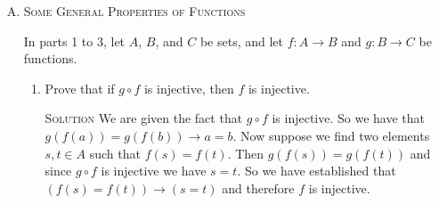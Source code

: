 \documentclass[twoside]{amsart}
\newcommand{\solution}{\textsc{Solution}\xspace}
\newcommand{\gOff}{\ensuremath{g \circ f}\xspace}
\begin{document}
\begin{enumerate}[A.]
\begin{enumerate}[1]
      \item if $A$ is a finite set, explain why any surjective function
      $f:A \to A$ is necessarily injective.

      \solution We are given the fact that every element in $A$ is
      the image for at least one element in $A$. This means
      that the range is the same size as the domain. Let's first
      assume that $A$ has only two distinct elements $a,b$ and
      $f(a)=f(b)$. Then we have two elements being mapped to one element.
      Which violates the fact that $f$ is surjective.
      Now assume $A$ is any finite set and it has two distinct elements
      $a,b$ where $f(a)=f(b)$. Then again there must be at least one element
      in $A$ which is not the image of an element by $f$. This is a contradition
      and therfore $f$ must be injective.

      \item Are the statements in part 2 and 3 true when $A$ is an infinite
      set? If not, give a counterexample.

      \solution No. A counterexample to part 2 is part 6 of A. A 
      counterexample of part 3 is part 4 of A.

      \item If $A$ has $n$ elements, how many functions are there
      from $A$ to $A$? How many bijective functionare are them
      from $A$ to $A$.

      \solution There are $n^n$ functions from $A$ to $A$. There
      are $n!$ bijective functions from $A$ to $A$.

   \end{enumerate}

   \item \textsc{Some General Properties of Functions}

   \noindent In parts 1 to 3, let $A$, $B$, and $C$ be sets, and let
   $f:A \to B$ and $g:B \to C$ be functions.

   \begin{enumerate}[1]
      \item Prove that if \gOff is injective, then $f$ is injective.

      \solution We are given the fact that \gOff is injective.
      So we have that $g(f(a))=g(f(b)) \to a=b$. Now suppose we
      find two elements $s,t \in A$ such that $f(s)=f(t)$.
      Then $g(f(s))=g(f(t))$ and since \gOff is injective we have
      $s=t$. So we have established that $(f(s)=f(t)) \to (s = t)$
      and therefore $f$ is injective.


\end{enumerate}
\end{enumerate}
\end{document}
